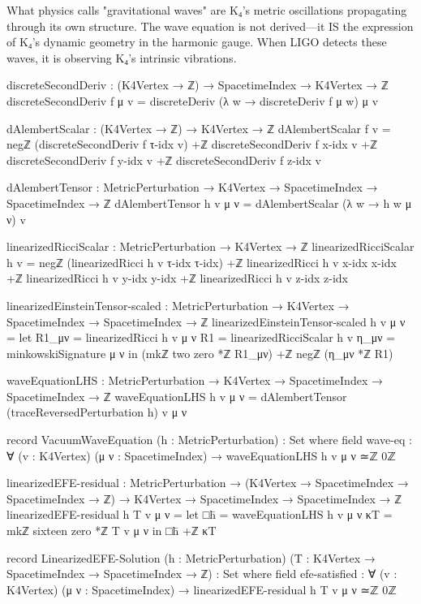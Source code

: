 \documentclass[11pt,a4paper]{book}
\begin{document}
What physics calls "gravitational waves" are K₄'s metric oscillations propagating through its own structure. The wave equation is not derived—it IS the expression of K₄'s dynamic geometry in the harmonic gauge. When LIGO detects these waves, it is observing K₄'s intrinsic vibrations.

\begin{code}
discreteSecondDeriv : (K4Vertex → ℤ) → SpacetimeIndex → K4Vertex → ℤ
discreteSecondDeriv f μ v = 
  discreteDeriv (λ w → discreteDeriv f μ w) μ v

dAlembertScalar : (K4Vertex → ℤ) → K4Vertex → ℤ
dAlembertScalar f v = 
  negℤ (discreteSecondDeriv f τ-idx v) +ℤ
  discreteSecondDeriv f x-idx v +ℤ
  discreteSecondDeriv f y-idx v +ℤ
  discreteSecondDeriv f z-idx v

dAlembertTensor : MetricPerturbation → K4Vertex → 
                  SpacetimeIndex → SpacetimeIndex → ℤ
dAlembertTensor h v μ ν = dAlembertScalar (λ w → h w μ ν) v

linearizedRicciScalar : MetricPerturbation → K4Vertex → ℤ
linearizedRicciScalar h v = 
  negℤ (linearizedRicci h v τ-idx τ-idx) +ℤ
  linearizedRicci h v x-idx x-idx +ℤ
  linearizedRicci h v y-idx y-idx +ℤ
  linearizedRicci h v z-idx z-idx

linearizedEinsteinTensor-scaled : MetricPerturbation → K4Vertex → 
                                   SpacetimeIndex → SpacetimeIndex → ℤ
linearizedEinsteinTensor-scaled h v μ ν = 
  let R1_μν = linearizedRicci h v μ ν
      R1    = linearizedRicciScalar h v
      η_μν  = minkowskiSignature μ ν
  in (mkℤ two zero *ℤ R1_μν) +ℤ negℤ (η_μν *ℤ R1)

waveEquationLHS : MetricPerturbation → K4Vertex → 
                  SpacetimeIndex → SpacetimeIndex → ℤ
waveEquationLHS h v μ ν = dAlembertTensor (traceReversedPerturbation h) v μ ν

record VacuumWaveEquation (h : MetricPerturbation) : Set where
  field
    wave-eq : ∀ (v : K4Vertex) (μ ν : SpacetimeIndex) →
              waveEquationLHS h v μ ν ≃ℤ 0ℤ

linearizedEFE-residual : MetricPerturbation → 
                          (K4Vertex → SpacetimeIndex → SpacetimeIndex → ℤ) →
                          K4Vertex → SpacetimeIndex → SpacetimeIndex → ℤ
linearizedEFE-residual h T v μ ν = 
  let □h̄ = waveEquationLHS h v μ ν
      κT  = mkℤ sixteen zero *ℤ T v μ ν
  in □h̄ +ℤ κT

record LinearizedEFE-Solution (h : MetricPerturbation) 
                               (T : K4Vertex → SpacetimeIndex → SpacetimeIndex → ℤ) : Set where
  field
    efe-satisfied : ∀ (v : K4Vertex) (μ ν : SpacetimeIndex) →
                    linearizedEFE-residual h T v μ ν ≃ℤ 0ℤ


\end{code}
\end{document}
